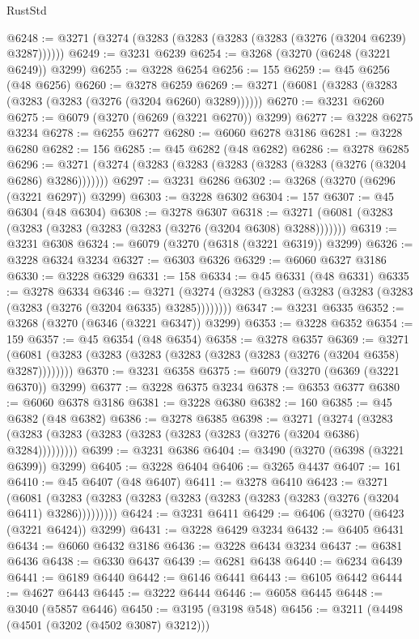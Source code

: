 \begin{lexlean}{RustStd}
\begin{coremodule}
{\begin{coremodule}
{{{{{{{{{{{{{{{{{{{{{{{{{{{{{{{{{{{{{@6248 := @3271 (@3274 (@3283 (@3283 (@3283 (@3283 (@3276 (@3204 @6239) @3287))))))
@6249 := @3231 @6239
@6254 := @3268 (@3270 (@6248 (@3221 @6249)) @3299)
@6255 := @3228 @6254
@6256 := 155
@6259 := @45 @6256 (@48 @6256)
@6260 := @3278 @6259
@6269 := @3271 (@6081 (@3283 (@3283 (@3283 (@3283 (@3276 (@3204 @6260) @3289))))))
@6270 := @3231 @6260
@6275 := @6079 (@3270 (@6269 (@3221 @6270)) @3299)
@6277 := @3228 @6275 @3234
@6278 := @6255 @6277
@6280 := @6060 @6278 @3186
@6281 := @3228 @6280
@6282 := 156
@6285 := @45 @6282 (@48 @6282)
@6286 := @3278 @6285
@6296 := @3271 (@3274 (@3283 (@3283 (@3283 (@3283 (@3283 (@3276 (@3204 @6286) @3286)))))))
@6297 := @3231 @6286
@6302 := @3268 (@3270 (@6296 (@3221 @6297)) @3299)
@6303 := @3228 @6302
@6304 := 157
@6307 := @45 @6304 (@48 @6304)
@6308 := @3278 @6307
@6318 := @3271 (@6081 (@3283 (@3283 (@3283 (@3283 (@3283 (@3276 (@3204 @6308) @3288)))))))
@6319 := @3231 @6308
@6324 := @6079 (@3270 (@6318 (@3221 @6319)) @3299)
@6326 := @3228 @6324 @3234
@6327 := @6303 @6326
@6329 := @6060 @6327 @3186
@6330 := @3228 @6329
@6331 := 158
@6334 := @45 @6331 (@48 @6331)
@6335 := @3278 @6334
@6346 := @3271 (@3274 (@3283 (@3283 (@3283 (@3283 (@3283 (@3283 (@3276 (@3204 @6335) @3285))))))))
@6347 := @3231 @6335
@6352 := @3268 (@3270 (@6346 (@3221 @6347)) @3299)
@6353 := @3228 @6352
@6354 := 159
@6357 := @45 @6354 (@48 @6354)
@6358 := @3278 @6357
@6369 := @3271 (@6081 (@3283 (@3283 (@3283 (@3283 (@3283 (@3283 (@3276 (@3204 @6358) @3287))))))))
@6370 := @3231 @6358
@6375 := @6079 (@3270 (@6369 (@3221 @6370)) @3299)
@6377 := @3228 @6375 @3234
@6378 := @6353 @6377
@6380 := @6060 @6378 @3186
@6381 := @3228 @6380
@6382 := 160
@6385 := @45 @6382 (@48 @6382)
@6386 := @3278 @6385
@6398 := @3271
    (@3274 (@3283 (@3283 (@3283 (@3283 (@3283 (@3283 (@3283 (@3276 (@3204 @6386) @3284)))))))))
@6399 := @3231 @6386
@6404 := @3490 (@3270 (@6398 (@3221 @6399)) @3299)
@6405 := @3228 @6404
@6406 := @3265 @4437
@6407 := 161
@6410 := @45 @6407 (@48 @6407)
@6411 := @3278 @6410
@6423 := @3271
    (@6081 (@3283 (@3283 (@3283 (@3283 (@3283 (@3283 (@3283 (@3276 (@3204 @6411) @3286)))))))))
@6424 := @3231 @6411
@6429 := @6406 (@3270 (@6423 (@3221 @6424)) @3299)
@6431 := @3228 @6429 @3234
@6432 := @6405 @6431
@6434 := @6060 @6432 @3186
@6436 := @3228 @6434 @3234
@6437 := @6381 @6436
@6438 := @6330 @6437
@6439 := @6281 @6438
@6440 := @6234 @6439
@6441 := @6189 @6440
@6442 := @6146 @6441
@6443 := @6105 @6442
@6444 := @4627 @6443
@6445 := @3222 @6444
@6446 := @6058 @6445
@6448 := @3040 (@5857 @6446)
@6450 := @3195 (@3198 @548)
@6456 := @3211 (@4498 (@4501 (@3202 (@4502 @3087) @3212)))
}}}}}}}}}}}}}}}}}}}}}}}}}}}}}}}}}}}}}
\end{coremodule}}
\end{coremodule}
\end{lexlean}
